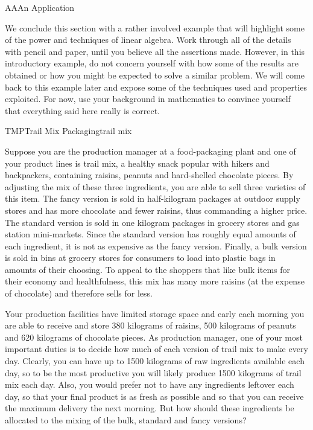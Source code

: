 %
\begin{subsect}{AA}{An Application}
%
\begin{para}We conclude this section with a rather involved example that will highlight some of the power and techniques of linear algebra.  Work through all of the details with pencil and paper, until you believe all the assertions made.  However, in this introductory example, do not concern yourself with how some of the results are obtained or how you might be expected to solve a similar problem.  We will come back to this example later and expose some of the techniques used and properties exploited.  For now, use your background in mathematics to convince yourself that everything said here really is correct.\end{para}
%
\begin{example}{TMP}{Trail Mix Packaging}{trail mix}
\begin{para}Suppose you are the production manager at a food-packaging plant and one of your product lines is trail mix, a healthy snack popular with hikers and backpackers, containing raisins, peanuts and hard-shelled chocolate pieces.  By adjusting the mix of these three ingredients, you are able to sell three varieties of this item.  The fancy version is sold in half-kilogram packages at outdoor supply stores and has more chocolate and fewer raisins, thus commanding a higher price.  The standard version is sold in one kilogram packages in grocery stores and gas station mini-markets.  Since the standard version has roughly equal amounts of each ingredient, it is not as expensive as the fancy version.  Finally, a bulk version is sold in bins at grocery stores for consumers to load into plastic bags in amounts of their choosing.  To appeal to the shoppers that like bulk items for their economy and healthfulness, this mix has many more raisins (at the expense of chocolate) and therefore sells for less.\end{para}
%
\begin{para}Your production facilities have limited storage space and early each morning you are able to receive and store 380 kilograms of raisins, 500 kilograms of peanuts and 620 kilograms of chocolate pieces.  As production manager, one of your most important duties is to decide how much of each version of trail mix to make every day.  Clearly, you can have up to 1500 kilograms of raw ingredients available each day, so to be the most productive you will likely produce 1500 kilograms of trail mix each day.  Also, you would prefer not to have any ingredients leftover each day, so that your final product is as fresh as possible and so that you can receive the maximum delivery the next morning.  But how should these ingredients be allocated to the mixing of the bulk, standard and fancy versions?

\end{para}
\end{example}
\end{subsect}
